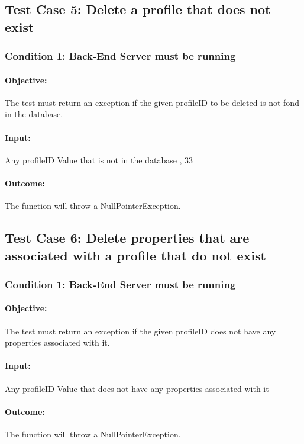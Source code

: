 \documentclass[a4paper,12pt]{article}
\begin{document}
\subsection{Test Case 5: Delete a profile that does not exist}
\subsubsection{Condition 1: Back-End Server must be running}
\paragraph{Objective:}The test must return an exception if the given profileID to be deleted is not fond in the database.
\paragraph{Input:} Any profileID Value that is not in the database , 33
\paragraph{Outcome: } The function will throw a NullPointerException.

\subsection{Test Case 6: Delete properties that are associated with a profile that do not exist}
\subsubsection{Condition 1: Back-End Server must be running}
\paragraph{Objective:}The test must return an exception if the given profileID does not have any properties associated with it.
\paragraph{Input:} Any profileID Value that does not have any properties associated with it
\paragraph{Outcome: } The function will throw a NullPointerException.
\end{document}
